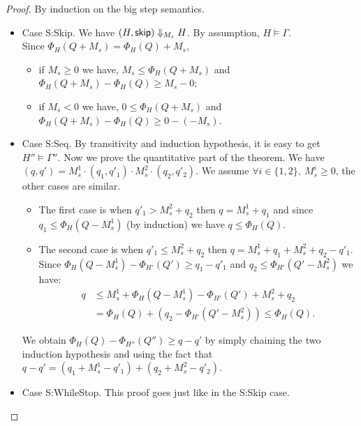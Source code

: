 \documentclass[10pt]{article}
\theoremstyle{newstyle}
\begin{document}
\begin{proof} By induction on the big step semantics.

\begin{itemize}

\item Case {\sc S:Skip}.
  We have $(H, \mathsf{skip}) \Downarrow_{M_s} H$.
  By assumption, $H \models \Gamma$. \\
  Since $\Phi_H(Q + M_s) = \Phi_H(Q) + M_s$,
  \begin{itemize}[topsep=0pt]
  \item
    if $M_s \ge 0$ we have,
      $M_s \le \Phi_H(Q + M_s)$ and
      $\Phi_H(Q + M_s) - \Phi_H(Q) \ge M_s - 0$;
  \item
    if $M_s < 0$ we have,
      $0 \le \Phi_H(Q + M_s)$ and
      $\Phi_H(Q + M_s) - \Phi_H(Q) \ge 0 - (-M_s)$.
  \end{itemize}

\item Case {\sc S:Seq}.
  By transitivity and induction hypothesis, it is
  easy to get $H'' \models \Gamma''$.  Now we prove
  the quantitative part of the theorem.  We have
  $(q, q') = M_s^1 \cdot (q_1, q'_1) \cdot M_s^2 \cdot (q_2, q'_2)$.
  We assume $\forall i \in \{1, 2\},~M_s^i \ge 0$, the other cases
  are similar.
  \begin{itemize}[topsep=0pt]
  \item
    The first case is when $q'_1 > M_s^2 + q_2$ then $q = M_s^1 + q_1$
    and since $q_1 \le \Phi_H(Q - M_s^1)$ (by induction) we have
    $q \le \Phi_H(Q)$.
  \item
    The second case is when $q'_1 \le M_s^2 + q_2$ then $q = M_s^1 + q_1 + M_s^2 + q_2 - q'_1$. \\
    Since $\Phi_H(Q - M_s^1) - \Phi_{H'}(Q') \ge q_1 - q'_1$
    and $q_2 \le \Phi_{H'}(Q' - M_s^2)$ we have:
    \begin{align*}
    q &\le M_s^1 + \Phi_H(Q - M_s^1) - \Phi_{H'}(Q') + M_s^2 + q_2 \\
      &= \Phi_H(Q) + (q_2 - \Phi_{H'}(Q' - M_s^2)) \le \Phi_H(Q).
   \end{align*}
  \end{itemize}
  We obtain $\Phi_H(Q) - \Phi_{H''}(Q'') \ge q - q'$ by simply chaining
  the two induction hypothesis and using the fact that $q - q' =
  (q_1 + M_s^1 - q'_1) + (q_2 + M_s^2 - q'_2)$.

\item Case {\sc S:WhileStop}.
  This proof goes just like in the {\sc S:Skip} case.


\end{itemize}
\end{proof}
\end{document}

